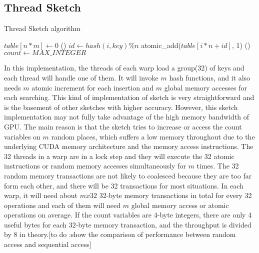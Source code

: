 \documentclass[conference]{IEEEtran}
\begin{document}
\subsection{Thread Sketch}
\begin{algorithm}
    \DontPrintSemicolon
    \caption{Thread Sketch algorithm}
    $table[n * m] \longleftarrow 0$\;
\Fn(){}
{
    {
        {
            $id \leftarrow hash(i, key) \% n$\;
            atomic\_add($table[i * n + id]$, 1)\;
        }
    }
}
\Fn(){}
{
    {
        $count \leftarrow MAX\_INTEGER$\;
    }
}

\end{algorithm}

In this implementation, the threads of each warp load a group(32) of keys and each thread will handle one of them. It will invoke $m$ hash functions, and it also needs $m$ atomic increment for each insertion and $m$ global memory accesses for each searching. This kind of implementation of sketch is very straightforward and is the basement of other sketches with higher accuracy. However, this sketch implementation may not fully take advantage of the high memory bandwidth of GPU. The main reason is that the sketch tries to increase or access the count variables on $m$ random places, which suffers a low memory throughout due to the underlying CUDA memory architecture and the memory access instructions. The 32 threads in a warp are in a lock step and they will execute the 32 atomic instructions or random memory accesses simultaneously for $m$ times. The 32 random memory transactions are not likely to coalesced because they are too far form each other, and there will be 32 transactions for most situations. In each warp, it will need about $m x 32$ 32-byte memory transactions in total for every 32 operations and each of them will need $m$ global memory access or atomic operations on average. If the count variables are 4-byte integers, there are only 4 useful bytes for each 32-byte memory transaction, and the throughput is divided by 8 in theory.[to do :show the comparison of performance between random access and sequential access]
\end{document}
